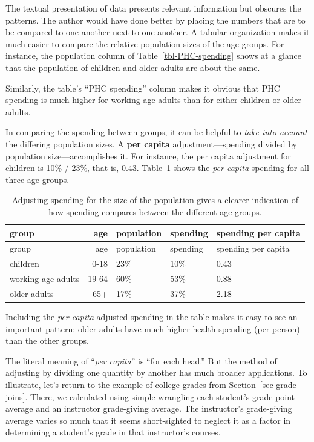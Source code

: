 \documentclass[
  letterpaper,
  DIV=11,
  numbers=noendperiod,
  oneside]{scrartcl}
\begin{document}
The textual presentation of data presents relevant information but
obscures the patterns. The author would have done better by placing the
numbers that are to be compared to one another next to one another. A
tabular organization makes it much easier to compare the relative
population sizes of the age groups. For instance, the population column
of Table~\ref{tbl-PHC-spending} shows at a glance that the population of
children and older adults are about the same.

Similarly, the table's ``PHC spending'' column makes it obvious that PHC
spending is much higher for working age adults than for either children
or older adults.

In comparing the spending between groups, it can be helpful to
\emph{take into account} the differing population sizes. A \textbf{per
capita} adjustment---spending divided by population size---accomplishes
it. For instance, the per capita adjustment for children is 10\% / 23\%,
that is, 0.43. Table~\ref{tbl-per-capita-spending} shows the \emph{per
capita} spending for all three age groups.

\begin{longtable}[]{@{}lrlll@{}}
\caption{Adjusting spending for the size of the population gives a
clearer indication of how spending compares between the different age
groups.}\label{tbl-per-capita-spending}\tabularnewline
\toprule\noalign{}
group & age & population & spending & spending per capita \\
\midrule\noalign{}
\endfirsthead
\toprule\noalign{}
group & age & population & spending & spending per capita \\
\midrule\noalign{}
\endhead
\bottomrule\noalign{}
\endlastfoot
children & 0-18 & 23\% & 10\% & 0.43 \\
working age adults & 19-64 & 60\% & 53\% & 0.88 \\
older adults & 65+ & 17\% & 37\% & 2.18 \\
\end{longtable}

Including the \emph{per capita} adjusted spending in the table makes it
easy to see an important pattern: older adults have much higher health
spending (per person) than the other groups.

The literal meaning of ``\emph{per capita}'' is ``for each head.'' But
the method of adjusting by dividing one quantity by another has much
broader applications. To illustrate, let's return to the example of
college grades from Section~\ref{sec-grade-joins}. There, we calculated
using simple wrangling each student's grade-point average and an
instructor grade-giving average. The instructor's grade-giving average
varies so much that it seems short-sighted to neglect it as a factor in
determining a student's grade in that instructor's courses.
\end{document}
